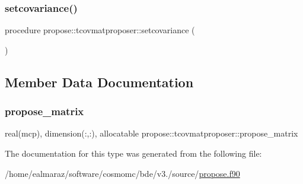 \subsubsection{\texorpdfstring{setcovariance()}{setcovariance()}}
{\footnotesize\ttfamily procedure propose\+::tcovmatproposer\+::setcovariance (\begin{DoxyParamCaption}{ }\end{DoxyParamCaption})}



\subsection{Member Data Documentation}
\mbox{\label{structpropose_1_1tcovmatproposer_ac873c1de338f6d641f66f360a25367e5}} 
\subsubsection{\texorpdfstring{propose\+\_\+matrix}{propose\_matrix}}
{\footnotesize\ttfamily real(mcp), dimension(\+:,\+:), allocatable propose\+::tcovmatproposer\+::propose\+\_\+matrix}



The documentation for this type was generated from the following file\+:\begin{DoxyCompactItemize}
\item 
/home/ealmaraz/software/cosmomc/bde/v3./source/\mbox{\hyperlink{propose_8f90}{propose.\+f90}}\end{DoxyCompactItemize}
